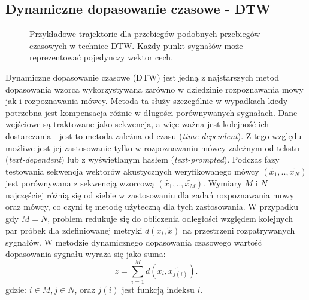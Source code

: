\subsection{Dynamiczne dopasowanie czasowe - DTW}

\begin{figure}
  \centering
    
    \caption{Przykładowe trajektorie  dla przebiegów podobnych przebiegów czasowych w technice DTW. Każdy punkt sygnałów może reprezentować pojedynczy wektor cech.}
    \label{dtw}
\end{figure}

Dynamiczne dopasowanie czasowe (DTW) jest jedną z najstarszych metod dopasowania wzorca \cite{multidsp} wykorzystywana zarówno w dziedzinie rozpoznawania mowy jak i rozpoznawania mówcy. Metoda ta służy szczególnie w wypadkach kiedy potrzebna jest kompensacja różnic w długości porównywanych sygnałach. Dane wejściowe są traktowane jako sekwencja, a więc ważna jest kolejność ich dostarczania - jest to metoda zależna od czasu (\textit{time dependent}). Z tego względu możliwe jest jej zastosowanie
tylko w rozpoznawaniu mówcy zależnym od tekstu (\textit{text-dependent}) lub z wyświetlanym hasłem (\textit{text-prompted}). Podczas fazy testowania sekwencja wektorów akustycznych weryfikowanego mówcy $(\tilde{x_1},..,\tilde{x_N})$ jest porównywana z sekwencją wzorcową $(\tilde{x_1},..,\tilde{x_M})$. Wymiary $M$ i $N$ najczęściej różnią się od siebie w zastosowaniu dla zadań rozpoznawania mowy oraz mówcy, co czyni tę metodę użyteczną dla tych zastosowania. W przypadku gdy $M=N$, problem
redukuje się do obliczenia odległości względem kolejnych par próbek dla zdefiniowanej metryki $d(x_i, \tilde{x})$ na przestrzeni rozpatrywanych sygnałów. W metodzie dynamicznego dopasowania czasowego wartość dopasowania sygnału wyraża się jako suma:
\begin{equation}
  z = \sum_{i=1}^{M} d(x_i,\tilde{x_{j(i)}}).
  \label{z}
\end{equation}
gdzie: $i \in M, j \in N$, oraz $j(i)$ jest funkcją indeksu $i$.


